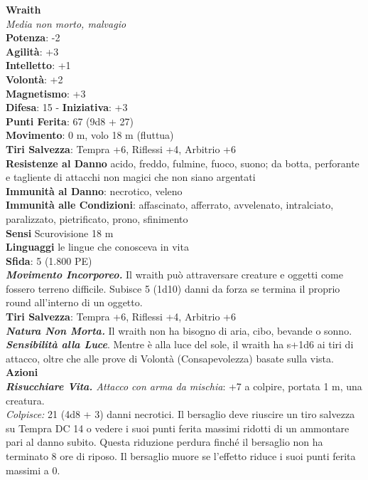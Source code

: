 \begin{multicols}{2}
\medskip\textbf{Wraith}\\
\emph{Media non morto, malvagio}\\
\textbf{Potenza}: -2\\
\textbf{Agilità}: +3\\
\textbf{Intelletto}: +1\\
\textbf{Volontà}: +2\\
\textbf{Magnetismo}: +3\\
\textbf{Difesa}: 15 - \textbf{Iniziativa}: +3\\
\textbf{Punti Ferita}: 67 (9d8 + 27)\\
\textbf{Movimento}: 0 m, volo 18 m (fluttua)\\
\textbf{Tiri Salvezza}: Tempra +6, Riflessi +4, Arbitrio +6\\
\textbf{Resistenze al Danno} acido, freddo, fulmine, fuoco, suono; da botta, perforante e tagliente di attacchi non magici che non siano argentati\\
\textbf{Immunità al Danno}: necrotico, veleno\\
\textbf{Immunità alle Condizioni}: affascinato, afferrato, avvelenato, intralciato, paralizzato, pietrificato, prono, sfinimento\\
\textbf{Sensi} Scurovisione 18 m\\
\textbf{Linguaggi} le lingue che conosceva in vita\\
\textbf{Sfida}: 5 (1.800 PE)\smallskip\\
\emph{\textbf{Movimento Incorporeo.}} Il wraith può attraversare creature e oggetti come fossero terreno difficile. Subisce 5 (1d10) danni da forza se termina il proprio round all'interno di un oggetto.\\
\textbf{Tiri Salvezza}: Tempra +6, Riflessi +4, Arbitrio +6\\
\emph{\textbf{Natura Non Morta.}} Il wraith non ha bisogno di aria, cibo, bevande o sonno.\\
\emph{\textbf{Sensibilità alla Luce}}. Mentre è alla luce del sole, il wraith ha s+1d6 ai tiri di attacco, oltre che alle prove di Volontà (Consapevolezza) basate sulla vista.\\
\smallskip\textbf{Azioni}\\
\emph{\textbf{Risucchiare Vita.} Attacco con arma da mischia}: +7 a colpire, portata 1 m, una creatura.\\
\emph{Colpisce:} 21 (4d8 + 3) danni necrotici. Il bersaglio deve riuscire un tiro salvezza su Tempra DC 14 o vedere i suoi punti ferita massimi ridotti di un ammontare pari al danno subito. Questa riduzione perdura finché il bersaglio non ha terminato 8 ore di riposo. Il bersaglio muore se l'effetto riduce i suoi punti ferita massimi a 0.\\


\end{multicols}
